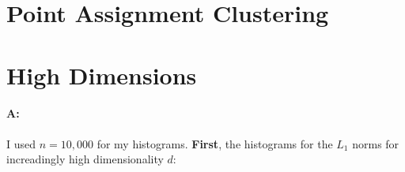 \documentclass[11pt]{article}
\begin{document}
\section{Point Assignment Clustering}




\section{High Dimensions}

\paragraph{A:} 

I used $n=10,000$ for my histograms. \textbf{First}, the histograms for the $L_1$ norms for increadingly high dimensionality $d$:
\end{document}
